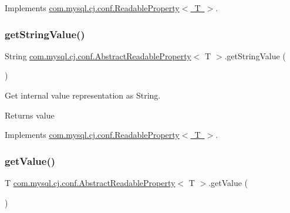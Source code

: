Implements \mbox{\hyperlink{interfacecom_1_1mysql_1_1cj_1_1conf_1_1_readable_property_af8f94a55a672bc15ef5169c07dcf8614}{com.\+mysql.\+cj.\+conf.\+Readable\+Property$<$ T $>$}}.

\mbox{\label{classcom_1_1mysql_1_1cj_1_1conf_1_1_abstract_readable_property_a2a7a4ec0038e77928d07df31a52e3e8a}} 
\subsubsection{\texorpdfstring{get\+String\+Value()}{getStringValue()}}
{\footnotesize\ttfamily String \mbox{\hyperlink{classcom_1_1mysql_1_1cj_1_1conf_1_1_abstract_readable_property}{com.\+mysql.\+cj.\+conf.\+Abstract\+Readable\+Property}}$<$ T $>$.get\+String\+Value (\begin{DoxyParamCaption}{ }\end{DoxyParamCaption})}

Get internal value representation as String.

\begin{DoxyReturn}{Returns}
value 
\end{DoxyReturn}


Implements \mbox{\hyperlink{interfacecom_1_1mysql_1_1cj_1_1conf_1_1_readable_property_a33c24e6ce00a092c5ab1929d241110ba}{com.\+mysql.\+cj.\+conf.\+Readable\+Property$<$ T $>$}}.

\mbox{\label{classcom_1_1mysql_1_1cj_1_1conf_1_1_abstract_readable_property_abb381de77253efc91da51b518f28ed42}} 
\subsubsection{\texorpdfstring{get\+Value()}{getValue()}}
{\footnotesize\ttfamily T \mbox{\hyperlink{classcom_1_1mysql_1_1cj_1_1conf_1_1_abstract_readable_property}{com.\+mysql.\+cj.\+conf.\+Abstract\+Readable\+Property}}$<$ T $>$.get\+Value (\begin{DoxyParamCaption}{ }\end{DoxyParamCaption})}

